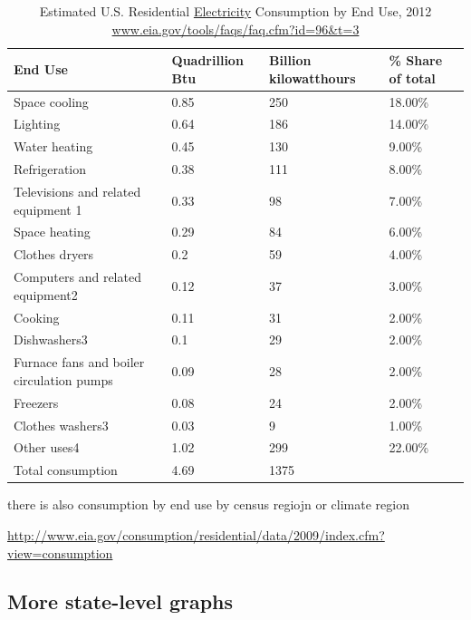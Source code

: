 \documentclass[10pt, letterpaper]{article}
\begin{document}
\begin{spacing}{1.4}
\begin{table}[H]\centering\footnotesize
\caption{\label{eleEndUse}  Estimated U.S. Residential \underline{Electricity} Consumption by End
  Use, 2012 \url{www.eia.gov/tools/faqs/faq.cfm?id=96&t=3}}
\begin{tabular} {llll}   \hline 
End Use&Quadrillion Btu &Billion kilowatthours& \% Share of total\\\hline 
Space cooling&0.85&250&18.00\%\\
Lighting&0.64&186&14.00\%\\
Water heating&0.45&130&9.00\%\\
Refrigeration&0.38&111&8.00\%\\
Televisions and related equipment 1&0.33&98&7.00\%\\
Space heating&0.29&84&6.00\%\\
Clothes dryers&0.2&59&4.00\%\\
Computers and related equipment2&0.12&37&3.00\%\\
Cooking&0.11&31&2.00\%\\
Dishwashers3 &0.1&29&2.00\%\\
Furnace fans and boiler circulation pumps&0.09&28&2.00\%\\
Freezers&0.08&24&2.00\%\\
Clothes washers3&0.03&9&1.00\%\\
Other uses4&1.02&299&22.00\%\\
Total consumption&4.69&1375&\\\hline
\end{tabular}\end{table}

there is also consumption by end use by census regiojn or climate region

\url{http://www.eia.gov/consumption/residential/data/2009/index.cfm?view=consumption}

\subsection{More state-level graphs}


\end{spacing}
\end{document}
